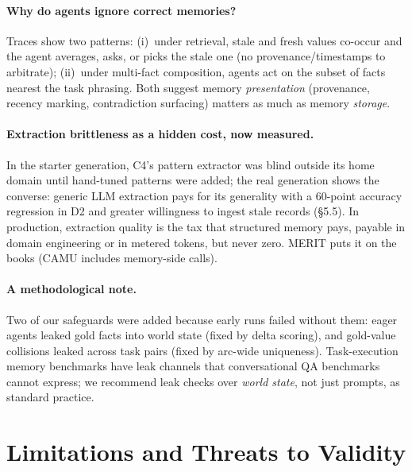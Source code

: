 \documentclass[11pt]{article}
\newcommand{\merit}{\textsc{MERIT}}
\begin{document}
\paragraph{Why do agents ignore correct memories?}
Traces show two patterns: (i)~under retrieval, stale and fresh values
co-occur and the agent averages, asks, or picks the stale one (no
provenance/timestamps to arbitrate); (ii)~under multi-fact composition,
agents act on the subset of facts nearest the task phrasing. Both suggest
memory \emph{presentation} (provenance, recency marking, contradiction
surfacing) matters as much as memory \emph{storage}.

\paragraph{Extraction brittleness as a hidden cost, now measured.}
In the starter generation, C4's pattern extractor was blind outside its home
domain until hand-tuned patterns were added; the real generation shows the
converse: generic LLM extraction pays for its generality with a 60-point
accuracy regression in D2 and greater willingness to ingest stale records
(\S5.5). In production, extraction quality is the tax that structured memory
pays, payable in domain engineering or in metered tokens, but never zero.
\merit{} puts it on the books (CAMU includes memory-side calls).

\paragraph{A methodological note.}
Two of our safeguards were added because early runs failed without them:
eager agents leaked gold facts into world state (fixed by delta scoring), and
gold-value collisions leaked across task pairs (fixed by arc-wide
uniqueness). Task-execution memory benchmarks have leak channels that
conversational QA benchmarks cannot express; we recommend leak checks over
\emph{world state}, not just prompts, as standard practice.

\section{Limitations and Threats to Validity}\label{sec:threats}
\end{document}
